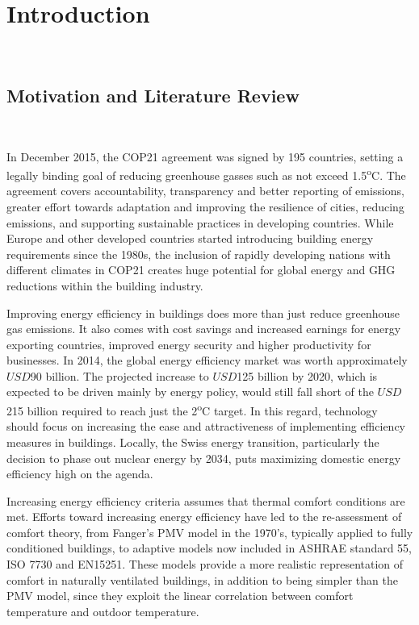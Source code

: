 
\chapter{Introduction}\
\label{ch:introduction}



\section{Motivation and Literature Review}\
\label{ch:motivation}

In December 2015, the COP21 agreement was signed by 195 countries, setting a legally binding goal of reducing greenhouse gasses such as not exceed 1.5\textsuperscript{o}C. The agreement covers accountability, transparency and better reporting of emissions, greater effort towards adaptation and improving the resilience of cities, reducing emissions, and supporting sustainable practices in developing countries. While Europe and other developed countries started introducing building energy requirements since the 1980s, the inclusion of rapidly developing nations with different climates in COP21 creates huge potential for global energy and GHG reductions within the building industry.

\item Improving energy efficiency in buildings does more than just reduce greenhouse gas emissions. It also comes with cost savings and increased earnings for energy exporting countries, improved energy security and higher productivity for businesses\cite{EIA}. In 2014, the global energy efficiency market was worth approximately $USD$90 billion. The projected increase to $USD$125 billion by 2020, which is expected to be driven mainly by energy policy, would still fall short of the $USD$215 billion required to reach just the 2\textsuperscript{o}C target\cite{EIA}. In this regard, technology should focus on increasing the ease and attractiveness of implementing efficiency measures in buildings. Locally, the Swiss energy transition, particularly the decision to phase out nuclear energy by 2034, puts maximizing domestic energy efficiency high on the agenda.

\item Increasing energy efficiency criteria assumes that thermal comfort conditions are met. Efforts toward increasing energy efficiency have led to the re-assessment of comfort theory, from Fanger's PMV model \cite{fanger1970thermal} in the 1970's, typically applied to fully conditioned buildings, to adaptive models now included in ASHRAE standard 55, ISO 7730 and EN15251. These models provide a more realistic representation of comfort in naturally ventilated buildings, in addition to being simpler than the PMV model, since they exploit the linear correlation between comfort temperature and outdoor temperature. 

